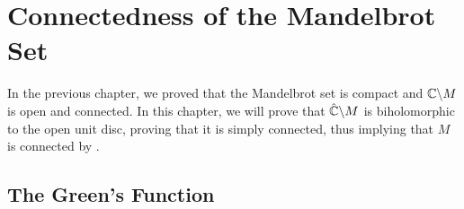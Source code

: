 \chapter{Connectedness of the Mandelbrot Set}
In the previous chapter, we proved that the Mandelbrot set is compact and \( \mathbb{C}\backslash M \)
is open and connected. In this chapter, we will prove that \( \hat{\mathbb{C}}\backslash M \) is biholomorphic
to the open unit disc, proving that it is simply connected, thus implying that \( M \) is connected by .

\section{The Green's Function}

